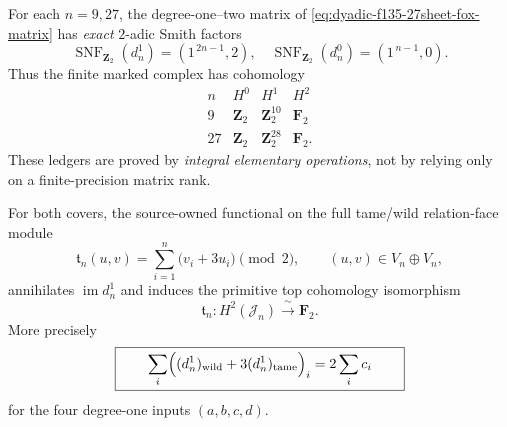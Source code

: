 \begin{theorem}
\label{thm:dyadic-f135-smith-9-27}
For each $n=9,27$,
the degree-one--two
matrix of
\eqref{eq:dyadic-f135-27sheet-fox-matrix}
has \emph{exact}
$2$-adic
Smith factors
\begin{equation}\label{eq:dyadic-f135-two-smith-factors}
\boxed{
\operatorname{SNF}_{\mathbf Z_2}(d_n^1)
=(1^{\,2n-1},2),
\quad
\operatorname{SNF}_{\mathbf Z_2}(d_n^0)
=(1^{\,n-1},0).
}
\end{equation}
Thus the finite
marked complex
has cohomology
\begin{equation}\label{eq:dyadic-f135-two-cohom-ledgers}
\boxed{
\begin{array}{c|ccc}
n&H^0&H^1&H^2\\ \hline
9&
\mathbf Z_2&
\mathbf Z_2^{10}&
\mathbf F_2\\
27&
\mathbf Z_2&
\mathbf Z_2^{28}&
\mathbf F_2.
\end{array}}
\end{equation}
These ledgers are
proved by \emph{integral
elementary operations},
not by relying only
on a finite-precision
matrix rank.

For both covers,
the source-owned
functional on the
full tame/wild
relation-face module
\begin{equation}\label{eq:dyadic-f135-odd-degree-top-trace}
\boxed{
\mathfrak t_n(u,v)
=\sum_{i=1}^{n}
\bigl(v_i+3u_i\bigr)
\pmod2,
\qquad
(u,v)\in V_n\oplus V_n,
}
\end{equation}
annihilates
$\operatorname{im}d_n^1$
and induces the
primitive top
cohomology isomorphism
\[
\mathfrak t_n:
H^2(\mathcal J_n)
\xrightarrow{\;\sim\;}\mathbf F_2.
\]
More precisely
\begin{equation}\label{eq:dyadic-f135-top-trace-integral-identity}
\boxed{\qquad
\sum_i
\Bigl((d_n^1)_{\rm wild}
+3(d_n^1)_{\rm tame}\Bigr)_i
=2\sum_i c_i
\qquad}
\end{equation}
for the four
degree-one inputs
$(a,b,c,d)$.
\end{theorem}

